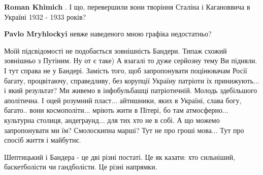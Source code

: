 \begin{itemize}
\begin{itemize}
\textbf{Roman Khimich} . І що, перевершили вони творіння Сталіна і Кагановвича в Україні 1932 - 1933 років?

\textbf{Pavlo Mryhlockyi} невже наведеного мною графіка недостатньо?

\end{itemize} %


Моїй підсвідомості не подобається зовнішність Бандери. Типаж схожий зовнішньо з
Путіним. Ну от є таке) А взагалі то дуже серйозну тему Ви підняли. І тут справа
не у Бандері. Замість того, щоб запропонувати поцінювачам Росії багату,
процвітаючу, справедливу, без корупції Україну патріоти їх принижують... і який
результат? Ми живемо в інфобульбашці патріотичній. Молодь здебільшого
аполітична. І оцей розумний пласт... айтишники, яких в Україні, слава богу,
багато.. вони космополіти... мріють жити в Пітері, бо там атмосферно... культурна
столиця, андеграунд... для тих хто не в собі. А що можемо запропонувати ми їм?
Смолоскипна марші? Тут не про гроші мова... Тут про спосіб життя і майбутнє.


Шептицький і Бандера - це дві різні постаті. Це як казати: хто сильніший,
баскетболісти чи гандболісти. Це різні напрямки.

\end{itemize} %
